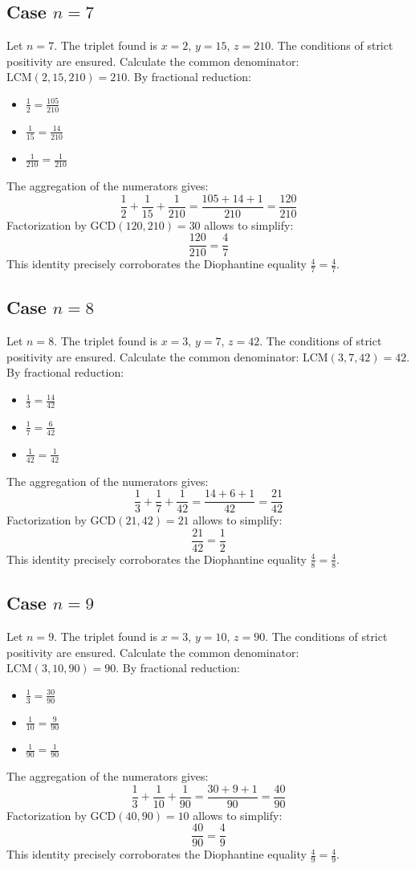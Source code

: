\documentclass[11pt,a4paper]{article}
\begin{document}
\subsection{Case $n = 7$}
Let $n = 7$. The triplet found is $x = 2$, $y = 15$, $z = 210$.
The conditions of strict positivity are ensured.
Calculate the common denominator: $\text{LCM}(2, 15, 210) = 210$.
By fractional reduction:
\begin{itemize}
    \item $\frac{1}{2} = \frac{105}{210}$
    \item $\frac{1}{15} = \frac{14}{210}$
    \item $\frac{1}{210} = \frac{1}{210}$
\end{itemize}
The aggregation of the numerators gives:
$$ \frac{1}{2} + \frac{1}{15} + \frac{1}{210} = \frac{105 + 14 + 1}{210} = \frac{120}{210} $$
Factorization by $\text{GCD}(120, 210) = 30$ allows to simplify:
$$ \frac{120}{210} = \frac{4}{7} $$
This identity precisely corroborates the Diophantine equality $\frac{4}{7} = \frac{4}{7}$.

\subsection{Case $n = 8$}
Let $n = 8$. The triplet found is $x = 3$, $y = 7$, $z = 42$.
The conditions of strict positivity are ensured.
Calculate the common denominator: $\text{LCM}(3, 7, 42) = 42$.
By fractional reduction:
\begin{itemize}
    \item $\frac{1}{3} = \frac{14}{42}$
    \item $\frac{1}{7} = \frac{6}{42}$
    \item $\frac{1}{42} = \frac{1}{42}$
\end{itemize}
The aggregation of the numerators gives:
$$ \frac{1}{3} + \frac{1}{7} + \frac{1}{42} = \frac{14 + 6 + 1}{42} = \frac{21}{42} $$
Factorization by $\text{GCD}(21, 42) = 21$ allows to simplify:
$$ \frac{21}{42} = \frac{1}{2} $$
This identity precisely corroborates the Diophantine equality $\frac{4}{8} = \frac{4}{8}$.

\subsection{Case $n = 9$}
Let $n = 9$. The triplet found is $x = 3$, $y = 10$, $z = 90$.
The conditions of strict positivity are ensured.
Calculate the common denominator: $\text{LCM}(3, 10, 90) = 90$.
By fractional reduction:
\begin{itemize}
    \item $\frac{1}{3} = \frac{30}{90}$
    \item $\frac{1}{10} = \frac{9}{90}$
    \item $\frac{1}{90} = \frac{1}{90}$
\end{itemize}
The aggregation of the numerators gives:
$$ \frac{1}{3} + \frac{1}{10} + \frac{1}{90} = \frac{30 + 9 + 1}{90} = \frac{40}{90} $$
Factorization by $\text{GCD}(40, 90) = 10$ allows to simplify:
$$ \frac{40}{90} = \frac{4}{9} $$
This identity precisely corroborates the Diophantine equality $\frac{4}{9} = \frac{4}{9}$.
\end{document}
